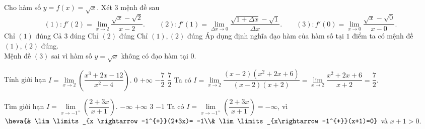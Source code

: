 \begin{ex}%
	Cho hàm số $y=f(x)= \sqrt{x}$. Xét $3$ mệnh đề sau
	$$ (1): f'(2)= \lim\limits_{x \rightarrow 2} \dfrac{\sqrt{x}-\sqrt{2}}{x-2}. \quad \quad (2):f'(1)= \lim\limits_{\Delta x \rightarrow 0} \dfrac{\sqrt{1+ \Delta x}-\sqrt{1}}{\Delta x}. \quad \quad (3): f'(0)= \lim\limits_{x \rightarrow 0} \dfrac{\sqrt{x}-\sqrt{0}}{x-0}.$$
	\choice
	{Chỉ $(1)$ đúng}
	{Cả 3 đúng}
	{Chỉ $(2)$ đúng}
	{\True Chỉ $(1), (2)$ đúng }
	\loigiai
	{Áp dụng định nghĩa đạo hàm của hàm số tại $1$ điểm ta có mệnh đề $(1), (2)$ đúng.\\
		Mệnh đề $(3)$ sai vì hàm số $y=\sqrt{x}$ không có đạo hàm tại $0$.
	}
\end{ex}

\begin{ex}%
	Tính giới hạn $I= \lim\limits_{x \rightarrow 2} \left(\dfrac{x^3+2x-12}{x^2-4}\right).$
	\choice
	{$0$}
	{$+ \infty$}
	{$-\dfrac{7}{2}$}
	{\True $\dfrac{7}{2}$}
	\loigiai
	{ Ta có $I= \lim\limits_{x \rightarrow 2}  
		\dfrac{(x-2)(x^2+2x+6)}{(x-2)(x+2)} =\lim\limits_{x \rightarrow 2} \dfrac{x^2+2x+6}{x+2} =\dfrac{7}{2}.$
	}
\end{ex}

\begin{ex}%
	Tìm giới hạn $I= \lim\limits_{x \rightarrow -1^{+}}\left( \dfrac{2+3x}{x+1}\right).$
	\choice
	{\True $- \infty$}
	{$+ \infty$}
	{$3$}
	{$-1$}
	\loigiai
	{Ta có $I= \lim\limits_{x \rightarrow -1^{+}}\left( \dfrac{2+3x}{x+1}\right)=-\infty$, vì $\heva{& \lim\limits_{x \rightarrow -1^{+}}(2+3x)= -1\\& \lim\limits_{x\rightarrow -1^{+}}(x+1)=0} $ và $x+1>0.$
	}
\end{ex}

